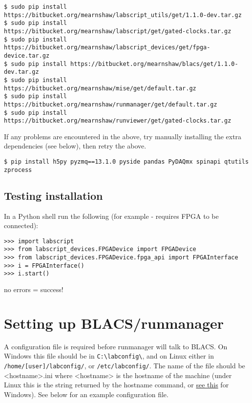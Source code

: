 \documentclass[11pt,a4paper]{article}
\begin{document}
\begin{verbatim}
$ sudo pip install https://bitbucket.org/mearnshaw/labscript_utils/get/1.1.0-dev.tar.gz
$ sudo pip install https://bitbucket.org/mearnshaw/labscript/get/gated-clocks.tar.gz
$ sudo pip install https://bitbucket.org/mearnshaw/labscript_devices/get/fpga-device.tar.gz
$ sudo pip install https://bitbucket.org/mearnshaw/blacs/get/1.1.0-dev.tar.gz
$ sudo pip install https://bitbucket.org/mearnshaw/mise/get/default.tar.gz
$ sudo pip install https://bitbucket.org/mearnshaw/runmanager/get/default.tar.gz
$ sudo pip install https://bitbucket.org/mearnshaw/runviewer/get/gated-clocks.tar.gz
\end{verbatim}

If any problems are encountered in the above, try manually installing the extra dependencies (see below), then retry the above.

\begin{verbatim}
$ pip install h5py pyzmq==13.1.0 pyside pandas PyDAQmx spinapi qtutils zprocess
\end{verbatim}

\subsection{Testing installation}
In a Python shell run the following (for example - requires FPGA to be connected):

\begin{verbatim}
>>> import labscript
>>> from labscript_devices.FPGADevice import FPGADevice
>>> from labscript_devices.FPGADevice.fpga_api import FPGAInterface
>>> i = FPGAInterface()
>>> i.start()
\end{verbatim}

no errors = success!

\section{Setting up BLACS/runmanager}
A configuration file is required before runmanager will talk to BLACS. On Windows this file should be in \texttt{C:\textbackslash{}labconfig\textbackslash{}}, and on Linux either in \texttt{/home/[user]/labconfig/}, or \texttt{/etc/labconfig/}. The name of the file should be \textless{}hostname\textgreater{}.ini where \textless{}hostname\textgreater{} is the hostname of the machine (under Linux this is the string returned by the hostname command, or \href{http://windows.microsoft.com/en-gb/windows/find-computer-name}{see this} for Windows). See below for an example configuration file.
\end{document}
